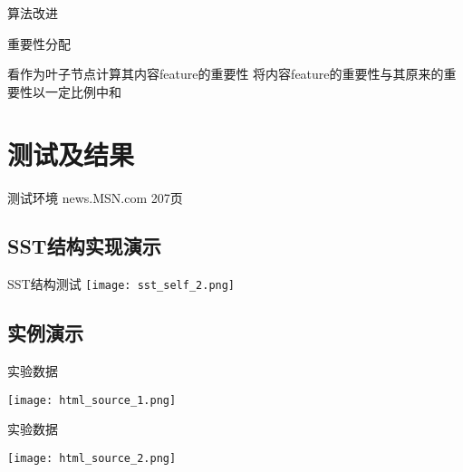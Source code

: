\documentclass{beamer}
\begin{document}
\begin{frame}{算法改进}
    \begin{block}{重要性分配}
    \begin{center}
    \begin{overprint}
        看作为叶子节点计算其内容feature的重要性
        {}
        将内容feature的重要性与其原来的重要性以一定比例中和
        {}
    \end{overprint}
    \end{center}
    \end{block}
\end{frame}

\section{测试及结果}
\begin{frame}{测试环境}
    news.MSN.com 207页
\end{frame}
\subsection{SST结构实现演示}
\begin{frame}{SST结构测试}
    \texttt{[image: sst\_self\_2.png]}
\end{frame}

\subsection{实例演示}
\begin{frame}{实验数据}
    \begin{center}
    \texttt{[image: html\_source\_1.png]}
    \end{center}
\end{frame}
\begin{frame}{实验数据}
    \begin{center}
    \texttt{[image: html\_source\_2.png]}
    \end{center}
\end{frame}
\end{document}
